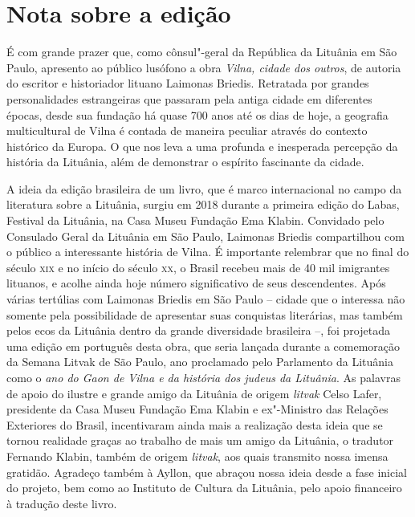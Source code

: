 \chapter[Nota sobre a edição, \textit{por Laura Tupe}]{Nota sobre a edição}

\noindent{}É com grande prazer que, como cônsul"-geral da República da Lituânia em
São Paulo, apresento ao público lusófono a obra \textit{Vilna, cidade dos
outros}, de autoria do escritor e historiador lituano Laimonas Briedis.
Retratada por grandes personalidades estrangeiras que passaram pela
antiga cidade em diferentes épocas, desde sua fundação há quase 700 anos
até os dias de hoje, a geografia multicultural de Vilna é contada
de maneira peculiar através do contexto histórico da Europa. O que nos
leva a uma profunda e inesperada percepção da história da Lituânia, 
além de demonstrar o espírito fascinante da cidade.

A ideia da edição brasileira de um livro, que é marco internacional no
campo da literatura sobre a Lituânia, surgiu em 2018 durante a primeira
edição do Labas, Festival da Lituânia, na Casa Museu Fundação Ema Klabin.
Convidado pelo Consulado Geral da Lituânia em São Paulo, Laimonas
Briedis compartilhou com o público a interessante história de Vilna. É
importante relembrar que no final do século \textsc{xix} e no início do século
\textsc{xx}, o Brasil recebeu mais de 40 mil imigrantes lituanos, e acolhe ainda
hoje número significativo de seus descendentes. Após várias tertúlias
com Laimonas Briedis em São Paulo -- cidade que o interessa não somente
pela possibilidade de apresentar suas conquistas literárias, mas também
pelos ecos da Lituânia dentro da grande diversidade brasileira --, foi
projetada uma edição em português desta obra, que seria lançada durante
a comemoração da Semana Litvak de São Paulo, ano proclamado pelo
Parlamento da Lituânia como o \textit{ano do Gaon de Vilna e da história
dos judeus da Lituânia}. As palavras de apoio do ilustre e grande amigo
da Lituânia de origem \textit{litvak} Celso Lafer, presidente da
Casa Museu Fundação Ema Klabin e ex"-Ministro das Relações Exteriores do Brasil,
incentivaram ainda mais a realização desta ideia que se tornou realidade
graças ao trabalho de mais um amigo da Lituânia, o tradutor Fernando
Klabin, também de origem \textit{litvak}, aos quais transmito nossa imensa
gratidão. Agradeço também à Ayllon, que abraçou nossa ideia
desde a fase inicial do projeto, bem como ao Instituto de Cultura da
Lituânia, pelo apoio financeiro à tradução deste livro.

